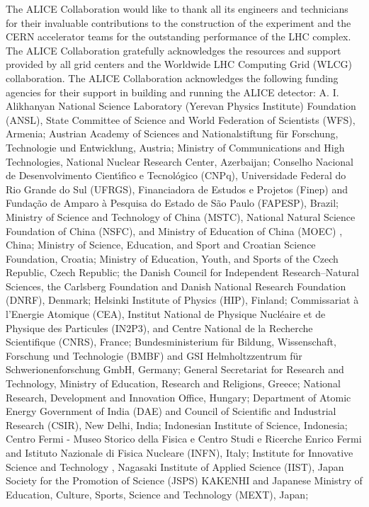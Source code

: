 
The ALICE Collaboration would like to thank all its engineers and technicians for their invaluable contributions to the construction of the experiment and the CERN accelerator teams for the outstanding performance of the LHC complex.
%
The ALICE Collaboration gratefully acknowledges the resources and support provided by all grid centers and the Worldwide LHC Computing Grid (WLCG) collaboration.
%
The ALICE Collaboration acknowledges the following funding agencies for their support in building and running the ALICE detector:
%
A. I. Alikhanyan National Science Laboratory (Yerevan Physics Institute) Foundation (ANSL), State Committee of Science and World Federation of Scientists (WFS), Armenia;
%
Austrian Academy of Sciences and Nationalstiftung f\"{u}r Forschung, Technologie und Entwicklung, Austria;
%
Ministry of Communications and High Technologies, National Nuclear Research Center, Azerbaijan;
%
Conselho Nacional de Desenvolvimento Cient\'{\i}fico e Tecnol\'{o}gico (CNPq), Universidade Federal do Rio Grande do Sul (UFRGS), Financiadora de Estudos e Projetos (Finep) and Funda\c{c}\~{a}o de Amparo \`{a} Pesquisa do Estado de S\~{a}o Paulo (FAPESP), Brazil;
%
Ministry of Science and Technology of China (MSTC), National Natural Science Foundation of China (NSFC), and Ministry of Education of China (MOEC) , China;
%
Ministry of Science, Education, and Sport and Croatian Science Foundation, Croatia;
%
Ministry of Education, Youth, and Sports of the Czech Republic, Czech Republic;
%
the Danish Council for Independent Research--Natural Sciences, the Carlsberg Foundation and Danish National Research Foundation (DNRF), Denmark;
%
Helsinki Institute of Physics (HIP), Finland;
%
Commissariat \`{a} l'Energie Atomique (CEA), Institut National de Physique Nucl\'{e}aire et de Physique des Particules (IN2P3), and Centre National de la Recherche Scientifique (CNRS), France;
%
Bundesministerium f\"{u}r Bildung, Wissenschaft, Forschung und Technologie (BMBF) and GSI Helmholtzzentrum f\"{u}r Schwerionenforschung GmbH, Germany;
%
General Secretariat for Research and Technology, Ministry of Education, Research and Religions, Greece;
%
National Research, Development and Innovation Office, Hungary;
%
Department of Atomic Energy Government of India (DAE) and Council of Scientific and Industrial Research (CSIR), New Delhi, India;
%
Indonesian Institute of Science, Indonesia;
%
Centro Fermi - Museo Storico della Fisica e Centro Studi e Ricerche Enrico Fermi and Istituto Nazionale di Fisica Nucleare (INFN), Italy;
%
Institute for Innovative Science and Technology , Nagasaki Institute of Applied Science (IIST), Japan Society for the Promotion of Science (JSPS) KAKENHI and Japanese Ministry of Education, Culture, Sports, Science and Technology (MEXT), Japan;
